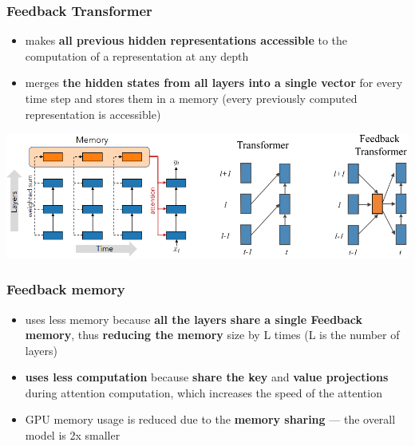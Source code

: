 \documentclass{beamer}
\begin{document}
\begin{frame}
    \frametitle{Feedback Transformer}
    \begin{itemize}
        \item makes \textbf{all previous hidden representations accessible} to the computation of a representation at any depth
        \item merges \textbf{the hidden states from all layers into a single
vector} for every time step and stores them in a memory (every previously computed representation is accessible)
    \end{itemize}
    \begin{center}
        \includegraphics[scale=0.34]{img/feedback_transformer_architecture.png}
    \end{center}
\end{frame}

\begin{frame}
    \frametitle{Feedback memory}
    \begin{itemize}
        \item uses less memory because  \textbf{all the layers share a single Feedback memory}, thus \textbf{reducing the memory} size by L times (L is the number of layers)
        \item \textbf{uses less computation} because \textbf{share the key} and \textbf{value projections} during attention computation, which increases the speed of the attention
        \item GPU memory usage is reduced due to the \textbf{memory sharing} — the
overall model is 2x smaller
    \end{itemize}
\end{frame}
\end{document}

